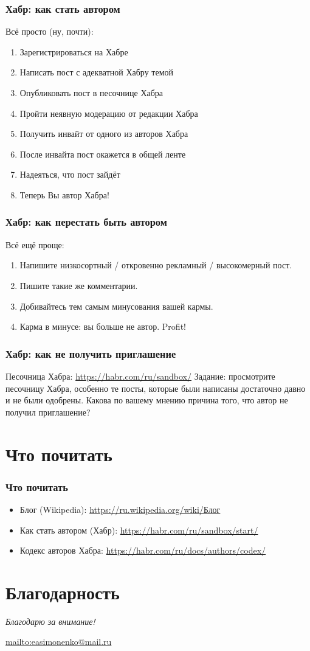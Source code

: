 \documentclass[12pt]{beamer}
\begin{document}
\begin{frame}
  \frametitle{Хабр: как стать автором}
  Всё просто (ну, почти):
  \begin{enumerate}
  \item Зарегистрироваться на Хабре
  \item Написать пост с адекватной Хабру темой
  \item Опубликовать пост в песочнице Хабра
  \item Пройти неявную модерацию от редакции Хабра
  \item Получить инвайт от одного из авторов Хабра
  \item После инвайта пост окажется в общей ленте
  \item Надеяться, что пост зайдёт
  \item Теперь Вы автор Хабра!
  \end{enumerate}
\end{frame}

\begin{frame}
  \frametitle{Хабр: как перестать быть автором}
  Всё ещё проще:
  \begin{enumerate}
  \item Напишите низкосортный / откровенно рекламный / высокомерный пост.
  \item Пишите такие же комментарии.
  \item Добивайтесь тем самым минусования вашей кармы.
  \item Карма в минусе: вы больше не автор. Profit!
  \end{enumerate}
\end{frame}

\begin{frame}
  \frametitle{Хабр: как не получить приглашение}
  Песочница Хабра: \url{https://habr.com/ru/sandbox/}
  Задание: просмотрите песочницу Хабра, особенно те посты, которые были написаны достаточно давно
  и не были одобрены. Какова по вашему мнению причина того, что автор не получил приглашение?
\end{frame}

\section{Что почитать}

\begin{frame}
  \frametitle{Что почитать}
  \begin{itemize}
  \item Блог (Wikipedia): \url{https://ru.wikipedia.org/wiki/Блог}
  \item Как стать автором (Хабр): \url{https://habr.com/ru/sandbox/start/}
  \item Кодекс авторов Хабра: \url{https://habr.com/ru/docs/authors/codex/}
  \end{itemize}
\end{frame}

\section*{Благодарность}

\begin{frame}
  \center
  \textit{Благодарю за внимание!}

  \textbf{\textsl{\inserttitle}}

  \insertauthor

  \url{mailto:easimonenko@mail.ru}

  \insertinstitute
\end{frame}
\end{document}

